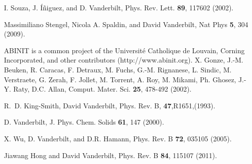 \documentclass[11pt,fleqn]{article}
\begin{document}
\begin{thebibliography}{99}
I. Souza, J. \'{I}\~{n}iguez, and D. Vanderbilt, Phys. Rev. Lett. {\bf 89},
117602 (2002).

Massimiliano Stengel, Nicola A. Spaldin, and David Vanderbilt,
Nat Phys {\bf 5}, 304 (2009).

  {\sf ABINIT} is a common project of the
  Universit\'{e} Catholique de Louvain, Corning Incorporated, and
  other contributors (http://www.abinit.org).  X. Gonze, J.-M.
  Beuken, R. Caracas, F. Detraux, M. Fuchs, G.-M.  Rignanese, L.
  Sindic, M. Verstraete, G. Zerah, F. Jollet, M. Torrent, A.
  Roy, M. Mikami, Ph. Ghosez, J.-Y. Raty, D.C. Allan, Comput.
  Mater. Sci. {\bf 25}, 478-492 (2002).

R.~D. King-Smith, David Vanderbilt,  Phys. Rev. B, {\bf 47},R1651,(1993).

D. Vanderbilt, J. Phys. Chem. Solids {\bf 61}, 147 (2000).

X. Wu, D. Vanderbilt, and D.R. Hamann, Phys. Rev. B {\bf 72}, 035105 (2005).

 Jiawang Hong and David Vanderbilt, Phys. Rev. B
  {\bf 84}, 115107 (2011).







\end{thebibliography}
\end{document}
